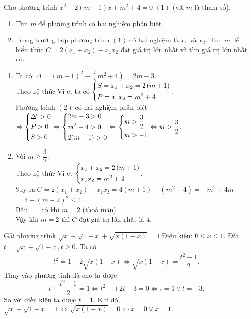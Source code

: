 \begin{ex}%
Cho phương trình $x^2-2( m+1)x+m^2+4=0$  $(1)$ (với $m$ là tham số).
    \begin{enumerate}
        \item Tìm $m$ để phương trình có hai nghiệm phân biệt.
        \item Trong trường hợp phương trình $(1)$ có hai nghiệm là  $x_1$ và $x_2$. Tìm $m$ để biểu thức $C=2(x_1+x_2)-x_1x_2$ đạt giá trị lớn nhất và tìm giá trị lớn nhất đó.
    \end{enumerate}
\loigiai
    {
    \begin{enumerate}
        \item Ta có: $\Delta =( m+1)^2-(m^2+4)=2m-3$.\\
Theo hệ thức Vi-et ta có  $\left\{\begin{aligned}
  & S={{x}_{1}}+{{x}_{2}}=2\left( m+1 \right) \\
 & P={{x}_{1}}{{x}_{2}}={{m}^{2}}+4\end{aligned}\right.$.\\
Phương trình $(2)$ có hai nghiệm phân biệt \\
$\Leftrightarrow \left\{\begin{aligned}  & \Delta '>0 \\
 & P>0 \\
 & S>0\end{aligned}\right.\Leftrightarrow \left\{\begin{aligned}
  & 2m-3>0 \\
 & {{m}^{2}}+4>0 \\
 & 2(m+1)>0\end{aligned}\right.\Leftrightarrow \left\{\begin{aligned}
  & m>\dfrac{3}{2} \\
 & m>-1\end{aligned}\right.\Leftrightarrow m>\dfrac{3}{2}$.
        \item Với $m\ge \dfrac{3}{2}$.\\
         Theo hệ thức Vi-et $\left\{\begin{aligned}
& {{x}_{1}}+{{x}_{2}}=2\left( m+1 \right) \\
& {{x}_{1}}{{x}_{2}}={{m}^{2}}+4\end{aligned}\right.$.\\
Suy ra  $C=2({{x}_{1}}+{{x}_{2}})-{{x}_{1}}{{x}_{2}}=4\left( m+1 \right)-\left( {{m}^{2}}+4 \right)=-{{m}^{2}}+4m$
 $=4-{{\left( m-2 \right)}^{2}}\le 4$.\\
  Dấu $=$ có khi  $m = 2$ (thoả mãn).\\
Vậy khi $m = 2$ thì $C$ đạt giá trị lớn nhất là $4$.
    \end{enumerate}
    }
\end{ex}
\begin{ex}%
    Gải phương trình $\sqrt x+\sqrt{1-x}+\sqrt{x(1-x)}=1$
\loigiai
    {
  Điều kiện: $0\leq x\leq 1.$  Đặt $t=\sqrt x+\sqrt{1-x},t\geq 0.$ Ta có
$$ t^2=1+2\sqrt{x(1-x)}\Leftrightarrow \sqrt{x(1-x)}=\dfrac{t^2-1}{2}. $$
Thay vào phương tình đã cho ta được $$ t+\dfrac{t^2-1}{2}=1\Leftrightarrow t^2-+2t-3=0\Leftrightarrow t=1\vee t=-3. $$
So với điều kiện ta được $t=1.$ Khi đó, $\sqrt x+\sqrt{1-x}=1\Leftrightarrow \sqrt{x(1-x)}=0\Leftrightarrow x=0\vee x=1.$
    }
\end{ex}
